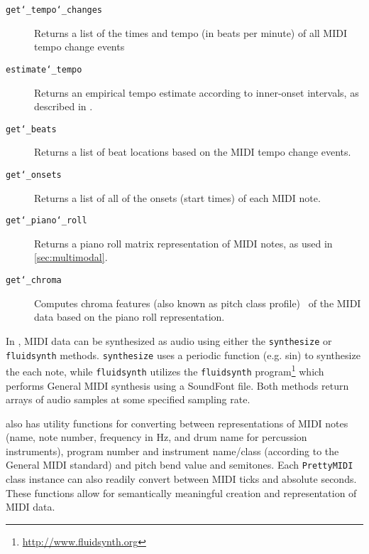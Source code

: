 \begin{description}
  \item[\texttt{get\char`_tempo\char`_changes}] Returns a list of the times and tempo (in beats per minute) of all MIDI tempo change events
  \item[\texttt{estimate\char`_tempo}] Returns an empirical tempo estimate according to inner-onset intervals, as described in \cite{dixon2001automatic}.
  \item[\texttt{get\char`_beats}] Returns a list of beat locations based on the MIDI tempo change events.
  \item[\texttt{get\char`_onsets}] Returns a list of all of the onsets (start times) of each MIDI note.
  \item[\texttt{get\char`_piano\char`_roll}] Returns a piano roll matrix representation of MIDI notes, as used in \cref{sec:multimodal}.
  \item[\texttt{get\char`_chroma}] Computes chroma features (also known as pitch class profile)~\cite{fujishima1999realtime} of the MIDI data based on the piano roll representation.
\end{description}

In \prettymidi{}, MIDI data can be synthesized as audio using either the \texttt{synthesize} or \texttt{fluidsynth} methods.
\texttt{synthesize} uses a periodic function (e.g. sin) to synthesize the each note, while \texttt{fluidsynth} utilizes the \texttt{fluidsynth} program\footnote{\url{http://www.fluidsynth.org}} which performs General MIDI synthesis using a SoundFont file.
Both methods return arrays of audio samples at some specified sampling rate.

\prettymidi{} also has utility functions for converting between representations of MIDI notes (name, note number, frequency in Hz, and drum name for percussion instruments), program number and instrument name/class (according to the General MIDI standard) and pitch bend value and semitones.
Each \texttt{PrettyMIDI} class instance can also readily convert between MIDI ticks and absolute seconds.
These functions allow for semantically meaningful creation and representation of MIDI data.
